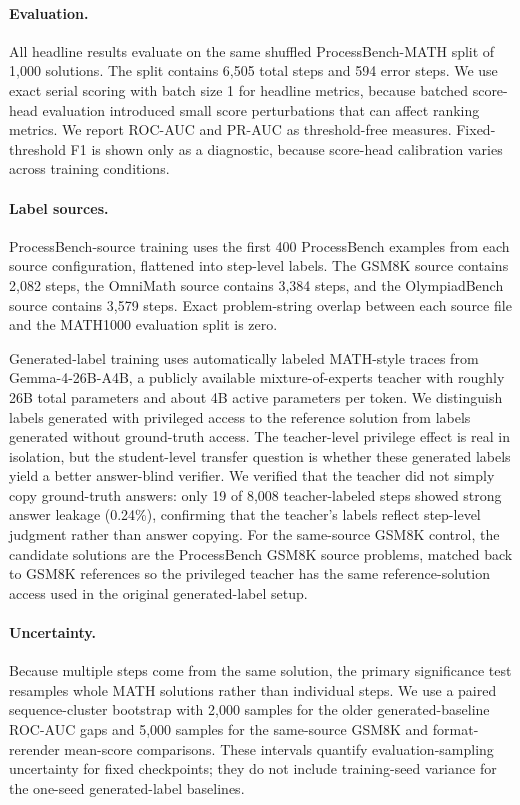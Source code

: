 \documentclass{article}
\begin{document}
\paragraph{Evaluation.}
All headline results evaluate on the same shuffled ProcessBench-MATH split of 1,000 solutions.
The split contains 6,505 total steps and 594 error steps.
We use exact serial scoring with batch size 1 for headline metrics, because batched score-head evaluation introduced small score perturbations that can affect ranking metrics.
We report ROC-AUC and PR-AUC as threshold-free measures.
Fixed-threshold F1 is shown only as a diagnostic, because score-head calibration varies across training conditions.

\paragraph{Label sources.}
ProcessBench-source training uses the first 400 ProcessBench examples from each source configuration, flattened into step-level labels.
The GSM8K source contains 2,082 steps, the OmniMath source contains 3,384 steps, and the OlympiadBench source contains 3,579 steps.
Exact problem-string overlap between each source file and the MATH1000 evaluation split is zero.

Generated-label training uses automatically labeled MATH-style traces from Gemma-4-26B-A4B, a publicly available mixture-of-experts teacher with roughly 26B total parameters and about 4B active parameters per token.
We distinguish labels generated with privileged access to the reference solution from labels generated without ground-truth access.
The teacher-level privilege effect is real in isolation, but the student-level transfer question is whether these generated labels yield a better answer-blind verifier.
We verified that the teacher did not simply copy ground-truth answers: only 19 of 8,008 teacher-labeled steps showed strong answer leakage (0.24\%), confirming that the teacher's labels reflect step-level judgment rather than answer copying.
For the same-source GSM8K control, the candidate solutions are the ProcessBench GSM8K source problems, matched back to GSM8K references so the privileged teacher has the same reference-solution access used in the original generated-label setup.

\paragraph{Uncertainty.}
Because multiple steps come from the same solution, the primary significance test resamples whole MATH solutions rather than individual steps.
We use a paired sequence-cluster bootstrap with 2,000 samples for the older generated-baseline ROC-AUC gaps and 5,000 samples for the same-source GSM8K and format-rerender mean-score comparisons.
These intervals quantify evaluation-sampling uncertainty for fixed checkpoints; they do not include training-seed variance for the one-seed generated-label baselines.
\end{document}
